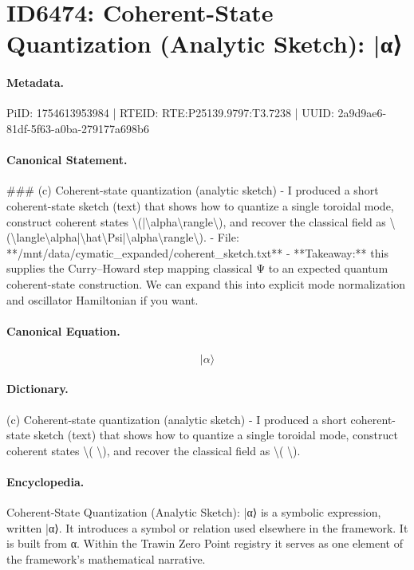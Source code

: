 \section*{ID6474: Coherent-State Quantization (Analytic Sketch): |α⟩}
\paragraph{Metadata.}
PiID: 1754613953984 | RTEID: RTE:P25139.9797:T3.7238 | UUID: 2a9d9ae6-81df-5f63-a0ba-279177a698b6

\paragraph{Canonical Statement.}
\#\#\# (c) Coherent-state quantization (analytic sketch) - I produced a short coherent-state sketch (text) that shows how to quantize a single toroidal mode, construct coherent states \textbackslash{}(|\textbackslash{}alpha\textbackslash{}rangle\textbackslash{}), and recover the classical field as \textbackslash{}(\textbackslash{}langle\textbackslash{}alpha|\textbackslash{}hat\textbackslash{}Psi|\textbackslash{}alpha\textbackslash{}rangle\textbackslash{}). - File: **/mnt/data/cymatic\_expanded/coherent\_sketch.txt** - **Takeaway:** this supplies the Curry–Howard step mapping classical Ψ to an expected quantum coherent-state construction. We can expand this into explicit mode normalization and oscillator Hamiltonian if you want.

\paragraph{Canonical Equation.}
\[
|\alpha\rangle
\]

\paragraph{Dictionary.}
(c) Coherent-state quantization (analytic sketch) - I produced a short coherent-state sketch (text) that shows how to quantize a single toroidal mode, construct coherent states \textbackslash{}( \textbackslash{}), and recover the classical field as \textbackslash{}( \textbackslash{}).

\paragraph{Encyclopedia.}
Coherent-State Quantization (Analytic Sketch): |α⟩ is a symbolic expression, written |α⟩. It introduces a symbol or relation used elsewhere in the framework. It is built from α. Within the Trawin Zero Point registry it serves as one element of the framework's mathematical narrative.
